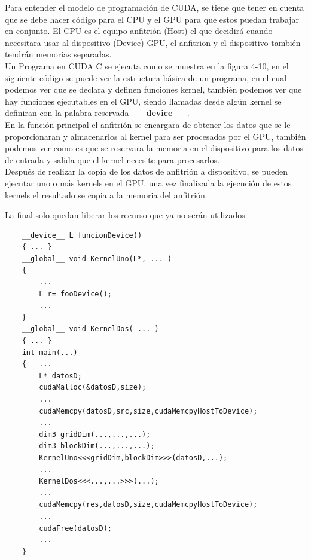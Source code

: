 Para entender el modelo de programación de CUDA, se tiene que tener en cuenta que se debe hacer código para el CPU y el GPU para que estos puedan trabajar en conjunto. El CPU es el equipo anfitrión (Host) el que decidirá cuando necesitara usar al dispositivo (Device) GPU, el anfitrion y el dispositivo también tendrán memorias separadas. 
\\
Un Programa en CUDA C se ejecuta como se muestra en la figura 4-10, en el siguiente código se puede ver la estructura básica de un programa, en el cual podemos ver que se declara y definen funciones kernel, también podemos ver que hay funciones ejecutables en el GPU, siendo llamadas desde algún kernel se definiran con la palabra reservada \textbf{\_\_device\_\_}.
\\
En la función principal el anfitrión se encargara de obtener los datos que se le proporcionaran y almacenarlos al kernel para ser procesados por el  GPU, también podemos ver como es que se reservara la memoria en el dispositivo para los datos de entrada y salida que el kernel necesite para procesarlos.
\\
Después de realizar la copia de los datos de anfitrión a dispositivo, se pueden ejecutar uno o más kernels en el GPU, una vez finalizada la ejecución de estos kernels el resultado se copia a la memoria del anfitrión. 
\pagebreak

La final solo quedan liberar los recurso que ya no serán utilizados. 

\begin{lstlisting}
	__device__ L funcionDevice()
	{ ... }	
	__global__ void KernelUno(L*, ... )
    {
    	...
   		L r= fooDevice();
   		...
    }
    __global__ void KernelDos( ... )
    { ... }    
    int main(...)
	{	...
		L* datosD;
		cudaMalloc(&datosD,size);
		...		
		cudaMemcpy(datosD,src,size,cudaMemcpyHostToDevice);		
		...	
		dim3 gridDim(...,...,...);
		dim3 blockDim(...,...,...);
		KernelUno<<<gridDim,blockDim>>>(datosD,...);	
		...
		KernelDos<<<...,...>>>(...);
		...
		cudaMemcpy(res,datosD,size,cudaMemcpyHostToDevice);
		...
		cudaFree(datosD);
		...			
	}
\end{lstlisting}




  







